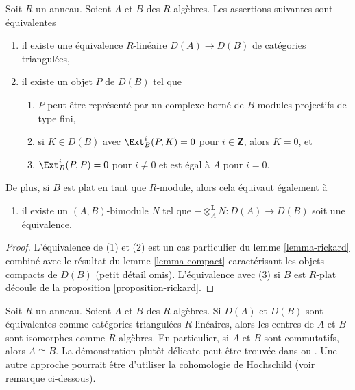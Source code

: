 \begin{lemma}
\label{lemma-rickard-rings}
Soit $R$ un anneau.
Soient $A$ et $B$ des $R$-algèbres. Les assertions suivantes sont équivalentes
\begin{enumerate}
\item il existe une équivalence $R$-linéaire $D(A) \to
D(B)$ de catégories triangulées,
\item il existe un objet $P$ de $D(B)$ tel que
\begin{enumerate}
\item $P$ peut être représenté par un complexe borné
de $B$-modules projectifs de type fini,
\item si $K \in D(B)$ avec $\Ext^i_B(P, K) = 0$ pour
$i \in \mathbf{Z}$, alors $K = 0$, et
\item $\Ext^i_B(P, P) = 0$ pour $i \not = 0$ et
est égal à $A$ pour $i= 0$.
\end{enumerate}
\end{enumerate}
De plus, si $B$ est plat en tant que $R$-module, alors cela
équivaut également à
\begin{enumerate}
\item[(3)] il existe un $(A, B)$-bimodule $N$ tel que $-
\otimes_A^\mathbf{L} N : D(A) \to D(B)$ soit une équivalence.
\end{enumerate}
\end{lemma}

\begin{proof}
L'équivalence de (1) et (2) est un cas particulier
du lemme \ref{lemma-rickard} combiné avec le résultat du
lemme \ref{lemma-compact} caractérisant les objets compacts de
$D(B)$ (petit détail omis).
L'équivalence avec (3) si $B$ est $R$-plat découle de la
proposition \ref{proposition-rickard}.
\end{proof}

\begin{remark}
\label{remark-centers}
Soit $R$ un anneau. Soient $A$ et $B$ des $R$-algèbres. Si
$D(A)$ et $D(B)$ sont équivalentes comme catégories triangulées
$R$-linéaires, alors les centres de $A$ et $B$ sont isomorphes comme
$R$-algèbres. En particulier, si $A$ et $B$ sont commutatifs, alors $A \cong B$.
La démonstration plutôt délicate peut être trouvée dans
\cite[Proposition 9.2]{Rickard} ou \cite[Proposition 6.3.2]{KZ}. Une autre approche
pourrait être d'utiliser la cohomologie de Hochschild (voir remarque
ci-dessous).
\end{remark}

